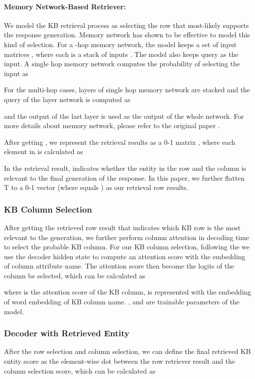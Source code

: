 \documentclass[11pt,a4paper]{article}
\begin{document}
\paragraph{Memory Network-Based Retriever:}
We model the KB retrieval process as selecting the row that
most-likely supports the response generation.
Memory network \cite{sukhbaatar2015end} has shown to be effective to
model this kind of selection.
For a -hop memory network,
the model keeps a set of input matrices ,
where each  is a stack of  inputs .
The model also keeps query  as the input.
A single hop memory network
computes the probability  of selecting 
the  input as

For the multi-hop cases, layers of single hop memory network
are stacked and the query of the  layer network
is computed as 

and the output of the last layer is used
as the output of the whole network.
For more details about memory network, please refer to the original paper \cite{sukhbaatar2015end}.

After getting , we represent the retrieval results
as a 0-1 matrix , where each element in 
is calculated as

In the retrieval result,  indicates whether the entity in the  row and the 
column is relevant to the final generation of the response.
In this paper, we further flatten T to a 0-1 vector  (where  equals ) as our retrieval row results.

\subsubsection{KB Column Selection}
After getting the retrieved row result that indicates which KB row is the most relevant to the generation, 
we further perform column attention in decoding time to select the probable KB column.
For our KB column selection, following the  we use the decoder hidden state  to compute an attention score with the embedding of column attribute name.
The attention score   then become the logits of the column be selected, which can be calculated as

where  is the attention score of the  KB column,  is represented with the embedding of word embedding of KB column name. ,  and  are trainable parameters of the model.
 
 \subsubsection{Decoder with Retrieved Entity }
 After the row selection and column selection, 
 we can define the final retrieved KB entity score as the element-wise dot between the row retriever result and the column selection score, which can be calculated as
\end{document}
